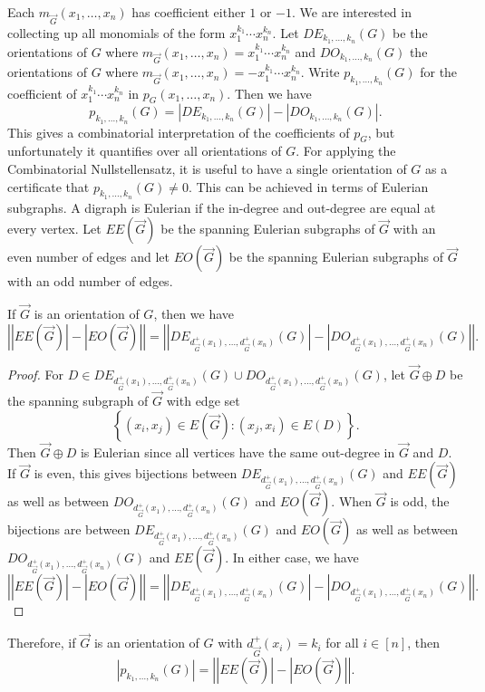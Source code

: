 \documentclass[openany]{tufte-book} %
\theoremstyle{plain}
\newcommand{\setb}[3]{\left\{ #1 \in #2 : #3 \right\}}
\newcommand{\card}[1]{\left|#1\right|}
\newcommand{\irange}[1]{\left[#1\right]}
\begin{document}
Each $m_{\vec{G}}(x_1,\ldots, x_n)$ has coefficient either $1$ or $-1$.   
We are interested in collecting up all monomials of the form $x_1^{k_1}\cdots x_n^{k_n}$.  Let $DE_{k_1,\ldots, k_n}(G)$ be the orientations of $G$ 
where $m_{\vec{G}}(x_1,\ldots, x_n) = x_1^{k_1}\cdots x_n^{k_n}$ and $DO_{k_1,\ldots, k_n}(G)$ the orientations of $G$ where $m_{\vec{G}}(x_1,\ldots, x_n) = -x_1^{k_1}\cdots x_n^{k_n}$.  
Write $p_{k_1, \ldots, k_n}(G)$ for the coefficient of $x_1^{k_1}\cdots x_n^{k_n}$ in $p_G(x_1,\ldots,x_n)$.  Then we have
\[p_{k_1, \ldots, k_n}(G) = |DE_{k_1,\ldots, k_n}(G)| - |DO_{k_1,\ldots, k_n}(G)|.\]
This gives a combinatorial interpretation of the coefficients of $p_G$, but unfortunately it quantifies over all orientations of $G$.  
For applying the Combinatorial Nullstellensatz, it is useful to have a single orientation of $G$ as a certificate that $p_{k_1, \ldots, k_n}(G) \ne 0$.  
This can be achieved in terms of Eulerian subgraphs.  A digraph is Eulerian if the in-degree and out-degree are equal at every vertex.  
Let $EE(\vec{G})$ be the spanning Eulerian subgraphs of $\vec{G}$ with an even number of edges and let $EO(\vec{G})$ be the spanning Eulerian subgraphs of $\vec{G}$ with an odd number of edges.  

\begin{EulerianOrientationsLemma}
If $\vec{G}$ is an orientation of $G$, then we have
\[\card{|EE(\vec{G})| - |EO(\vec{G})|} = \card{|DE_{d_{\vec{G}}^+(x_1), \ldots, d_{\vec{G}}^+(x_n)}(G)|- |DO_{d_{\vec{G}}^+(x_1), \ldots, d_{\vec{G}}^+(x_n)}(G)|}.\]
\end{EulerianOrientationsLemma}
\begin{proof}
	For $D \in DE_{d_{\vec{G}}^+(x_1), \ldots, d_{\vec{G}}^+(x_n)}(G) \cup DO_{d_{\vec{G}}^+(x_1), \ldots, d_{\vec{G}}^+(x_n)}(G)$, let $\vec{G} \oplus D$ be the spanning subgraph of $\vec{G}$ with edge set 
	\[\setb{(x_i,x_j)}{E(\vec{G})}{(x_j,x_i) \in E(D)}.\]
	Then $\vec{G} \oplus D$ is Eulerian since all vertices have the same out-degree in $\vec{G}$ and $D$.  If $\vec{G}$ is even, this gives bijections between $DE_{d_{\vec{G}}^+(x_1), \ldots, d_{\vec{G}}^+(x_n)}(G)$ and $EE(\vec{G})$ as well as between $DO_{d_{\vec{G}}^+(x_1), \ldots, d_{\vec{G}}^+(x_n)}(G)$ and $EO(\vec{G})$.  When $\vec{G}$ is odd, the bijections are between $DE_{d_{\vec{G}}^+(x_1), \ldots, d_{\vec{G}}^+(x_n)}(G)$ and $EO(\vec{G})$ as well as between $DO_{d_{\vec{G}}^+(x_1), \ldots, d_{\vec{G}}^+(x_n)}(G)$ and $EE(\vec{G})$.  In either case, we have
\[\card{|EE(\vec{G})| - |EO(\vec{G})|} = \card{|DE_{d_{\vec{G}}^+(x_1), \ldots, d_{\vec{G}}^+(x_n)}(G)|- |DO_{d_{\vec{G}}^+(x_1), \ldots, d_{\vec{G}}^+(x_n)}(G)|}.\]
\end{proof} 
Therefore, if $\vec{G}$ is an orientation of $G$ with $d_{\vec{G}}^+(x_i) = k_i$ for all $i \in \irange{n}$, then
\[|p_{k_1, \ldots, k_n}(G)| = \card{|EE(\vec{G})| - |EO(\vec{G})|}.\]
\end{document}
